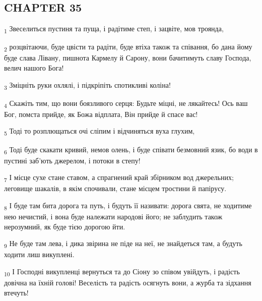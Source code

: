 \subsection{CHAPTER 35}
\begin{tcolorbox}
\textsubscript{1} Звеселиться пустиня та пуща, і радітиме степ, і зацвіте, мов троянда,
\end{tcolorbox}
\begin{tcolorbox}
\textsubscript{2} розцвітаючи, буде цвісти та радіти, буде втіха також та співання, бо дана йому буде слава Лівану, пишнота Кармелу й Сарону, вони бачитимуть славу Господа, велич нашого Бога!
\end{tcolorbox}
\begin{tcolorbox}
\textsubscript{3} Зміцніть руки охлялі, і підкріпіть спотикливі коліна!
\end{tcolorbox}
\begin{tcolorbox}
\textsubscript{4} Скажіть тим, що вони боязливого серця: Будьте міцні, не лякайтесь! Ось ваш Бог, помста прийде, як Божа відплата, Він прийде й спасе вас!
\end{tcolorbox}
\begin{tcolorbox}
\textsubscript{5} Тоді то розплющаться очі сліпим і відчиняться вуха глухим,
\end{tcolorbox}
\begin{tcolorbox}
\textsubscript{6} Тоді буде скакати кривий, немов олень, і буде співати безмовний язик, бо води в пустині заб'ють джерелом, і потоки в степу!
\end{tcolorbox}
\begin{tcolorbox}
\textsubscript{7} І місце сухе стане ставом, а спрагнений край збірником вод джерельних; леговище шакалів, в якім спочивали, стане місцем тростини й папірусу.
\end{tcolorbox}
\begin{tcolorbox}
\textsubscript{8} І буде там бита дорога та путь, і будуть її називати: дорога свята, не ходитиме нею нечистий, і вона буде належати народові його; не заблудить також нерозумний, як буде тією дорогою йти.
\end{tcolorbox}
\begin{tcolorbox}
\textsubscript{9} Не буде там лева, і дика звірина не піде на неї, не знайдеться там, а будуть ходити лиш викуплені.
\end{tcolorbox}
\begin{tcolorbox}
\textsubscript{10} І Господні викупленці вернуться та до Сіону зо співом увійдуть, і радість довічна на їхній голові! Веселість та радість осягнуть вони, а журба та зідхання втечуть!
\end{tcolorbox}
